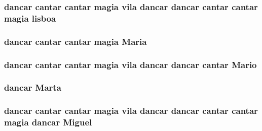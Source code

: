 \subsubsection[{\texorpdfstring{lisboa}{lisboa}}]{ {\bf dancar} {\bf cantar} {\bf cantar} {\bf magia} vila {\bf dancar} {\bf dancar} {\bf cantar} {\bf cantar} {\bf magia} lisboa}\hypertarget{jurados_8txt_afcb0be523bb30dc71d43c136869e3683}{}\label{jurados_8txt_afcb0be523bb30dc71d43c136869e3683}
\subsubsection[{\texorpdfstring{Maria}{Maria}}]{ {\bf dancar} {\bf cantar} {\bf cantar} {\bf magia} Maria}\hypertarget{jurados_8txt_a0b2ef1b8d2f47dfcb6f1424b0fd423be}{}\label{jurados_8txt_a0b2ef1b8d2f47dfcb6f1424b0fd423be}
\subsubsection[{\texorpdfstring{Mario}{Mario}}]{ {\bf dancar} {\bf cantar} {\bf cantar} {\bf magia} vila {\bf dancar} {\bf dancar} {\bf cantar} Mario}\hypertarget{jurados_8txt_a3b70027cdf723e9f232ef7e0a90245e7}{}\label{jurados_8txt_a3b70027cdf723e9f232ef7e0a90245e7}
\subsubsection[{\texorpdfstring{Marta}{Marta}}]{ {\bf dancar} Marta}\hypertarget{jurados_8txt_acaa9f92805c68fb12566e1910b1f38cc}{}\label{jurados_8txt_acaa9f92805c68fb12566e1910b1f38cc}
\subsubsection[{\texorpdfstring{Miguel}{Miguel}}]{ {\bf dancar} {\bf cantar} {\bf cantar} {\bf magia} vila {\bf dancar} {\bf dancar} {\bf cantar} {\bf cantar} {\bf magia} {\bf dancar} Miguel}\hypertarget{jurados_8txt_a909a3248ac75b977eaa39caef5735a73}{}\label{jurados_8txt_a909a3248ac75b977eaa39caef5735a73}

